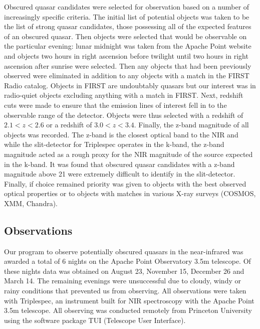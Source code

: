 \documentclass[preprint]{aastex}
\begin{document}
Obscured quasar candidates were selected for observation based on a number of increasingly specific criteria.  The initial list of potential objects was taken to be the list of strong quasar candidates, those possessing all of the expected features of an obscured quasar.  Then objects were selected that would be observable on the particular evening: lunar midnight was taken from the Apache Point website and objects two hours in right ascension before twilight until two hours in right ascension after sunrise were selected.  Then any objects that had been previously observed were eliminated in addition to any objects with a match in the FIRST Radio catalog.  Objects in FIRST are undoubtably quasars but our interest was in radio-quiet objects excluding anything with a match in FIRST.  Next, redshift cuts were made to ensure that the emission lines of interest fell in to the observable range of the detector.  Objects were thus selected with a redshift of $2.1 < z < 2.6$ or a redshift of $3.0 < z < 3.4$.  Finally, the z-band magnitude of all objects was recorded.  The z-band is the closest optical band to the NIR and while the slit-detector for Triplespec operates in the k-band, the z-band magnitude acted as a rough proxy for the NIR magnitude of the source expected in the k-band.  It was found that obscured quasar candidates with a z-band magnitude above 21 were extremely difficult to identify in the slit-detector.  Finally, if choice remained priority was given to objects with the best observed optical properties or to objects with matches in various X-ray surveys (COSMOS, XMM, Chandra).

\subsection{Observations}

Our program to observe potentially obscured quasars in the near-infrared was awarded a total of 6 nights on the Apache Point Observatory 3.5m telescope. Of these nights data was obtained on August 23, November 15, December 26 and March 14.  The remaining evenings were unsuccessful due to cloudy, windy or rainy conditions that prevented us from observing.  All observations were taken with Triplespec, an instrument built for NIR spectroscopy with the Apache Point 3.5m telescope. All observing was conducted remotely from Princeton University using the software package TUI (Telescope User Interface).  
\end{document}
